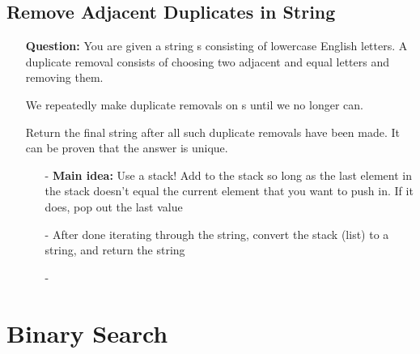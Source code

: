 \documentclass[12pt]{article}
\begin{document}
\subsection{Remove Adjacent Duplicates in String}
\begin{enumerate}
  \item[] \textbf{Question:} You are given a string s consisting of lowercase English letters. A duplicate removal consists of choosing two adjacent and equal letters and removing them.

We repeatedly make duplicate removals on s until we no longer can.

Return the final string after all such duplicate removals have been made. It can be proven that the answer is unique.

 

    \begin{enumerate}
      \item[-] \textbf{Main idea:} Use a stack! Add to the stack so long as the last element in the stack doesn't equal the current element that you want to push in. If it does, pop out the last value
      \item[-] After done iterating through the string, convert the stack (list) to a string, and return the string
      \item[-] 

    \end{enumerate}
\end{enumerate}







\section{Binary Search}
\end{document}
